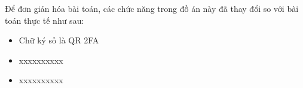Để đơn giản hóa bài toán, các chức năng trong đồ án này đã thay đổi so với bài toán thực tế như sau:

\begin{itemize}

\item Chữ ký số là QR 2FA

\item xxxxxxxxxx

\item xxxxxxxxxx

\end{itemize}